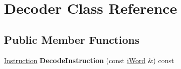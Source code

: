 \hypertarget{classDecoder}{
\section{Decoder Class Reference}
\label{classDecoder}
}
\subsection*{Public Member Functions}
\begin{DoxyCompactItemize}
\item 
\hypertarget{classDecoder_a9f297296b2c7752b81f70acaeac1e732}{
\hyperlink{structInstruction}{Instruction} {\bfseries DecodeInstruction} (const \hyperlink{classiWord}{iWord} \&) const }
\label{classDecoder_a9f297296b2c7752b81f70acaeac1e732}

\end{DoxyCompactItemize}

